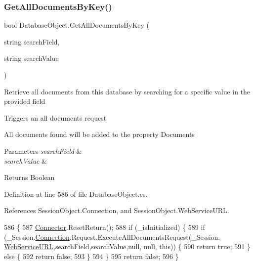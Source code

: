 \subsubsection{\texorpdfstring{Get\+All\+Documents\+By\+Key()}{GetAllDocumentsByKey()}}
{\footnotesize\ttfamily bool Database\+Object.\+Get\+All\+Documents\+By\+Key (\begin{DoxyParamCaption}\item[{string}]{search\+Field,  }\item[{string}]{search\+Value }\end{DoxyParamCaption})}



Retrieve all documents from this database by searching for a specific value in the provided field 

Triggers an all documents request

All documents found will be added to the property \textquotesingle{}Documents\textquotesingle{}


\begin{DoxyParams}{Parameters}
{\em search\+Field} & \\
\hline
{\em search\+Value} & \\
\hline
\end{DoxyParams}
\begin{DoxyReturn}{Returns}
Boolean
\end{DoxyReturn}


Definition at line 586 of file Database\+Object.\+cs.



References Session\+Object.\+Connection, and Session\+Object.\+Web\+Service\+U\+RL.


\begin{DoxyCode}
586                                                                              \{
587         \mbox{\hyperlink{class_connector}{Connector}}.ResetReturn();
588         \textcolor{keywordflow}{if} (\_isInitialized) \{
589             \textcolor{keywordflow}{if} (\_Session.\mbox{\hyperlink{class_session_object_a014bdbf705a753540e19bfb53030c55c}{Connection}}.Request.ExecuteAllDocumentsRequest(\_Session.
      \mbox{\hyperlink{class_session_object_a697c071c812fbf7ad1166b896fb44c16}{WebServiceURL}},searchField,searchValue,null, null, \textcolor{keyword}{this})) \{
590                 \textcolor{keywordflow}{return} \textcolor{keyword}{true};
591             \} \textcolor{keywordflow}{else} \{
592                 \textcolor{keywordflow}{return} \textcolor{keyword}{false};
593             \}
594         \}
595         \textcolor{keywordflow}{return} \textcolor{keyword}{false};
596     \}
\end{DoxyCode}
\mbox{\label{class_database_object_a4d8a7d73614f53a04fe8eb79bef2f614}} 
